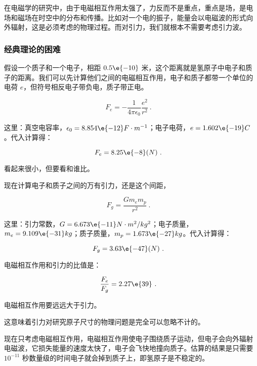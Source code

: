 在电磁学的研究中，由于电磁相互作用太强了，力反而不是重点，重点是场，是电场和磁场在时空中的分布和传播。比如对一个电的振子，能量会以电磁波的形式向外辐射，这是必须考虑的物理过程。而对引力，我们就根本不需要考虑引力波。

\subsubsection{经典理论的困难}

假设一个质子和一个电子，相距 $0.5\e{-10}$ 米，这个距离就是氢原子中电子和质子的距离。我们可以先计算他们之间的电磁相互作用，电子和质子都带一个单位的电荷 $e$，但符号相反电子带负电，质子带正电。

\begin{equation}
F_e = - \frac{1}{4 \pi \epsilon_0}\frac{e^2 }{r^2 }~.
\end{equation}

这里：真空电容率，$\epsilon_0 = 8.854\e{-12} F \cdot m^{-1}$；电子电荷，$e = 1.602\e{-19} C$。代入计算得：

\begin{equation}
F_e = 8.25\e{-8} (N)~.
\end{equation}

看起来很小，但要看和谁比。

现在计算电子和质子之间的万有引力，还是这个间距，

\begin{equation}
F_g = \frac{G m_e m_p }{r^2}~.
\end{equation}

这里：引力常数，$G = 6.673\e{-11} N \cdot m^2 / kg^2 $；电子质量，$m_e = 9.109\e{-31} kg $；质子质量，$m_p = 1.673 \e{-27 } kg  $。代入计算得：

\begin{equation}
F_g = 3.63\e{-47} (N)~.
\end{equation}


电磁相互作用和引力的比值是：

\begin{equation}
\frac{F_e}{ F_g } = 2.27\e{39}~.
\end{equation}

电磁相互作用要远远大于引力。

这意味着引力对研究原子尺寸的物理问题是完全可以忽略不计的。

现在只考虑电磁相互作用，电磁相互作用使电子围绕质子运动，但电子会向外辐射电磁波，它损失能量的速度太快了，电子会飞快地撞向质子。估算的结果是只需要 $10^{-11}$ 秒数量级的时间电子就会掉到质子上，即氢原子是不稳定的。

